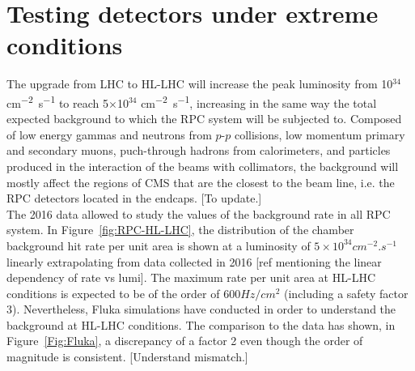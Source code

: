 \section{Testing detectors under extreme conditions}
\label{chapt5:sec:extreme}
	
	The upgrade from LHC to HL-LHC will increase the peak luminosity from 10$^{34}$ \si{cm^{-2}.s^{-1}} to reach 5$\times$10$^{34}$ \si{cm^{-2}.s^{-1}}, increasing in the same way the total expected background to which the RPC system will be subjected to.
	Composed of low energy gammas and neutrons from $p$-$p$ collisions, low momentum primary and secondary muons, puch-through hadrons from calorimeters, and particles produced in the interaction of the beams with collimators, the background will mostly affect the regions of CMS that are the closest to the beam line, i.e. the RPC detectors located in the endcaps. {\color{blue} [To update.]}\\
	
    The 2016 data allowed to study the values of the background rate in all RPC system.
	In Figure~\ref{fig:RPC-HL-LHC}, the distribution of the chamber background hit rate per unit area is shown at a luminosity of $5\times10^{34}cm^{-2}.s^{-1}$ linearly extrapolating from data collected in 2016 {\color{blue} [ref mentioning the linear dependency of rate vs lumi]}.
	The maximum rate per unit area at HL-LHC conditions is expected to be of the order of ${600}{Hz/cm^2}$ (including a safety factor 3).
	Nevertheless, Fluka simulations have conducted in order to understand the background at HL-LHC conditions.
	The comparison to the data has shown, in Figure~\ref{Fig:Fluka}, a discrepancy of a factor 2 even though the order of magnitude is consistent. {\color{blue} [Understand mismatch.]}\\
    
